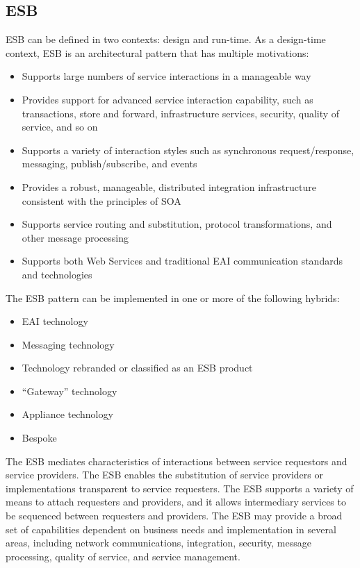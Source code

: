\documentclass[12pt,a4paper,final,twoside,onecolumn,titlepage]{book}
\begin{document}
\subsection{ESB}
\gls{ESB} can be defined in two contexts: design and run-time. As a design-time context, \gls{ESB} is an architectural pattern that has multiple motivations:
\begin{itemize}
\item Supports large numbers of service interactions in a manageable way
\item Provides support for advanced service interaction capability, such as transactions, store and forward, infrastructure services, security, quality of service, and so on
\item Supports a variety of interaction styles such as synchronous request/response, messaging, publish/subscribe, and events
\item Provides a robust, manageable, distributed integration infrastructure consistent with the principles of \gls{SOA}
\item Supports service routing and substitution, protocol transformations, and other message processing
\item Supports both Web Services and traditional \gls{EAI} communication standards and technologies
\end{itemize}
The ESB pattern can be implemented in one or more of the following hybrids:
\begin{itemize}
\item \gls{EAI} technology
\item Messaging technology
\item Technology rebranded or classified as an ESB product 
\item “Gateway” technology
\item Appliance technology
\item Bespoke
\end{itemize}
The \gls{ESB} mediates characteristics of interactions between service requestors and service providers. The ESB enables the substitution of service providers or implementations transparent to service requesters. The ESB supports a variety of means to attach requesters and providers, and it allows intermediary services to be sequenced between requesters and providers. The \gls{ESB} may provide a broad set of capabilities dependent on business needs and implementation in several areas, including network communications, integration, security, message processing, quality of service, and service management.
\end{document}
